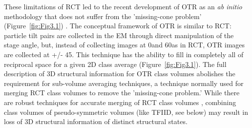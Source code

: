 \indent  These limitations of RCT led to the recent development of OTR as an \emph{ab initio} methodology that does not suffer from the 'missing-cone problem' (Figure~\ref{fig:Fig3.1}) \cite{Leschziner_452,Leschziner_1228}. The conceptual framework of OTR is similar to RCT: particle tilt pairs are collected in the EM through direct manipulation of the stage angle, but, instead of collecting images at 0\textdegree and 60\textdegree as in RCT, OTR images are collected at +/- 45\textdegree. This technique has the ability to fill in completely all of reciprocal space for a given 2D class average (Figure~\ref{fig:Fig3.1}). The full description of 3D structural information for OTR class volumes abolishes the requirement for sub-volume averaging techniques, a technique normally used for merging RCT class volumes to remove the 'missing-cone problem.' While there are robust techniques for accurate merging of RCT class volumes \cite{Scheres_2009}, combining class volumes of pseudo-symmetric volumes (like TFIID, see below) may result in loss of 3D structural information of distinct structural states. \\

